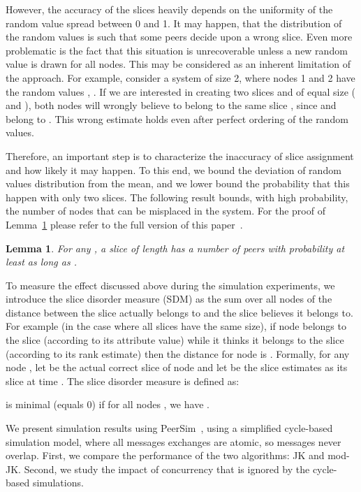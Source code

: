 \documentclass[times,10pt,twocolumn]{article}
\newtheorem{lemma}[theorem]{Lemma}
\begin{document}
However, the accuracy of the slices heavily depends on the uniformity of the random value
spread between 0 and 1.  It may happen, that the distribution of the random values
is such that some peers decide upon a wrong slice. Even more problematic is the fact that this situation
is unrecoverable unless a new random value is drawn for all nodes. 
This may be considered as an inherent limitation of
the approach.
For example, consider a system of size 2, where nodes 1 and 2 have the
random values , . If we are interested in creating
two slices  and  of equal size ( and ), 
both nodes will wrongly believe to belong to the same slice , since  and  belong to .
This wrong estimate holds even after perfect ordering of the random values.

Therefore, an important step is to characterize the inaccuracy of slice
assignment and how likely it may happen. 
To this end, we bound the deviation 
of random values distribution from the mean, and we lower bound the 
probability that this happen with only two slices.
The following result bounds, with high 
probability, the number of nodes that can be misplaced in the system.
For the proof of Lemma~\ref{lem:toprove} please refer to the full version of this paper~\cite{FGJKR06b}.

\begin{lemma}\label{lem:toprove}
For any , a slice  of length   has a
number of peers 
 with probability at least 
 as long as .
\end{lemma}

To measure the effect discussed above during the simulation experiments, 
we introduce the slice 
disorder measure (SDM) as the sum over all nodes  of the
distance between the slice  actually belongs to and the slice  believes
it belongs to.
For example (in the case where all slices have the same size), 
if node  belongs to the  slice (according to its attribute 
value) while it thinks it belongs to the  slice (according to its rank 
estimate) then the distance for node  is .
Formally, for any node , let  be the actual correct slice 
of node  and let  be the slice  estimates
as its slice at time .  The slice disorder measure is defined as:

 is minimal (equals 0) if for all nodes , 
we have .

\label{sec:simu2}

We present simulation results using PeerSim~\cite{JMB04}, using a simplified
cycle-based simulation model, where all messages exchanges are atomic,
so messages never overlap.
First, we compare the performance of the two algorithms: JK and mod-JK.
Second, we study the impact of concurrency that is ignored by the cycle-based
simulations.
\end{document}
